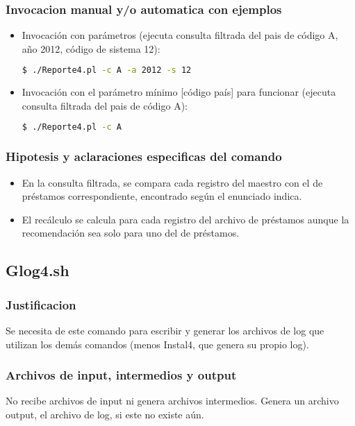\documentclass{article}
\begin{document}
		\subsubsection{Invocacion manual y/o automatica con ejemplos}
		\begin{itemize}
			\item Invocación con parámetros (ejecuta consulta filtrada del pais de código A, año 2012, código de sistema 12):
\begin{lstlisting}[language=bash] 
$ ./Reporte4.pl -c A -a 2012 -s 12
\end{lstlisting} 
			\item Invocación con el parámetro mínimo [código país] para funcionar (ejecuta consulta filtrada del pais de código A):
\begin{lstlisting}[language=bash] 
$ ./Reporte4.pl -c A
\end{lstlisting} 
		\end{itemize}
		\subsubsection{Hipotesis y aclaraciones especificas del comando}
		\begin{itemize}
			\item En la consulta filtrada, se compara cada registro del maestro con el de préstamos correspondiente, encontrado según
			el enunciado indica.
			\item El recálculo se calcula para cada registro del archivo de préstamos aunque la recomendación sea solo para uno del de préstamos.
		\end{itemize}
	
	\subsection{Glog4.sh}
	
		\subsubsection{Justificacion}
		Se necesita de este comando para escribir y generar los archivos de log que utilizan los demás comandos (menos Instal4, que genera su propio log).
		\subsubsection{Archivos de input, intermedios y output}
		No recibe archivos de input ni genera archivos intermedios. Genera un archivo output, el archivo de log, si este no existe aún.
\end{document}
